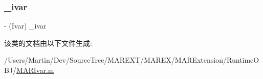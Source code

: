 \subsubsection{\texorpdfstring{\+\_\+ivar}{\_ivar}}
{\footnotesize\ttfamily -\/ (Ivar) \+\_\+ivar\hspace{0.3cm}{\ttfamily [protected]}}



该类的文档由以下文件生成\+:\begin{DoxyCompactItemize}
\item 
/\+Users/\+Martin/\+Dev/\+Source\+Tree/\+M\+A\+R\+E\+X\+T/\+M\+A\+R\+E\+X/\+M\+A\+R\+Extension/\+Runtime\+O\+B\+J/\hyperlink{_m_a_r_ivar_8m}{M\+A\+R\+Ivar.\+m}\end{DoxyCompactItemize}
